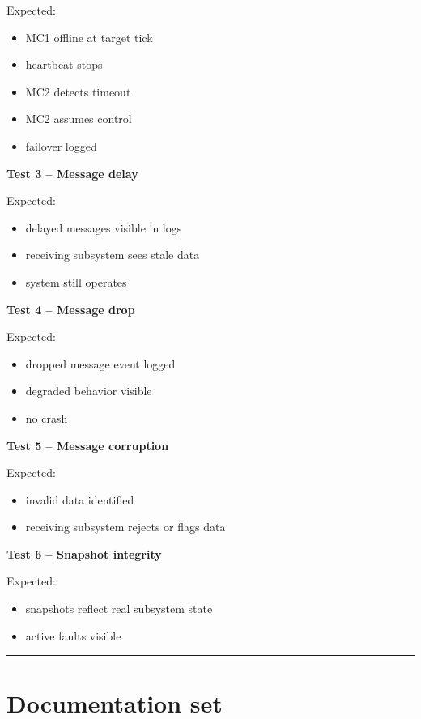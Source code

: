 \documentclass{report}
\begin{document}
Expected:
\begin{itemize}
   \item MC1 offline at target tick
   \item heartbeat stops
   \item MC2 detects timeout
   \item MC2 assumes control
   \item failover logged
\end{itemize}

\textbf{Test 3 -- Message delay}

Expected:
\begin{itemize}
   \item delayed messages visible in logs
   \item receiving subsystem sees stale data
   \item system still operates
\end{itemize}

\textbf{Test 4 -- Message drop}

Expected:
\begin{itemize}
   \item dropped message event logged
   \item degraded behavior visible
   \item no crash
\end{itemize}

\textbf{Test 5 -- Message corruption}

Expected:
\begin{itemize}
   \item invalid data identified
   \item receiving subsystem rejects or flags data
\end{itemize}

\textbf{Test 6 -- Snapshot integrity}

Expected:
\begin{itemize}
   \item snapshots reflect real subsystem state
   \item active faults visible
\end{itemize}

\begin{center}
\rule{0.9\textwidth}{1pt}
\end{center}
\section{Documentation set}
\end{document}
